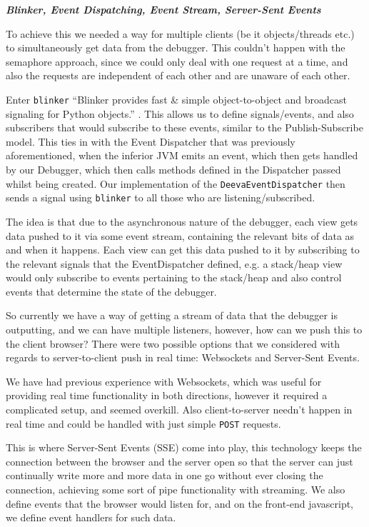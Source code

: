 \documentclass[11pt, a4paper]{article}
\begin{document}
\textbf{\emph{Blinker, Event Dispatching, Event Stream, Server-Sent Events}}

To achieve this we needed a way for multiple clients (be it objects/threads
etc.) to simultaneously get data from the debugger. This couldn't happen with
the semaphore approach, since we could only deal with one request at a time, and
also the requests are independent of each other and are unaware of each other.

Enter \texttt{blinker} ``Blinker provides fast \& simple object-to-object and
broadcast signaling for Python objects.'' \cite{blinker}. This allows us to
define signals/events, and also subscribers that would subscribe to these
events, similar to the Publish-Subscribe model. This ties in with the Event
Dispatcher that was previously aforementioned, when the inferior JVM emits an
event, which then gets handled by our Debugger, which then calls methods defined
in the Dispatcher passed whilst being created. Our implementation of the
\texttt{DeevaEventDispatcher} then sends a signal using \texttt{blinker} to all
those who are listening/subscribed.

The idea is that due to the asynchronous nature of the debugger, each view gets
data pushed to it via some event stream, containing the relevant bits of data as
and when it happens. Each view can get this data pushed to it by subscribing to
the relevant signals that the EventDispatcher defined, e.g. a stack/heap view
would only subscribe to events pertaining to the stack/heap and also control
events that determine the state of the debugger.

So currently we have a way of getting a stream of data that the debugger is
outputting, and we can have multiple listeners, however, how can we push this to
the client browser? There were two possible options that we considered with
regards to server-to-client push in real time: Websockets and Server-Sent
Events.

We have had previous experience with Websockets, which was useful for providing
real time functionality in both directions, however it required a complicated
setup, and seemed overkill. Also client-to-server needn't happen in real time
and could be handled with just simple \texttt{POST} requests.

This is where Server-Sent Events (SSE) come into play, this technology keeps the
connection between the browser and the server open so that the server can just
continually write more and more data in one go without ever closing the
connection, achieving some sort of pipe functionality with streaming. We also
define events that the browser would listen for, and on the front-end
javascript, we define event handlers for such data.
\end{document}
